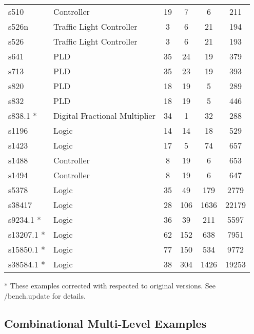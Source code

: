 {\begin{pespace}
\begin{center}
\begin{tabular}{|l|l|c|c|c|c|}
s510    & Controller                & 19     & 7      & 6     &   211 \\
s526n   & Traffic Light Controller  & 3      & 6      & 21    &   194 \\
s526    & Traffic Light Controller  & 3      & 6      & 21    &   193 \\
s641    & PLD                       & 35     & 24     & 19    &   379 \\
s713    & PLD                       & 35     & 23     & 19    &   393 \\
s820    & PLD                       & 18     & 19     & 5     &   289 \\
s832    & PLD                       & 18     & 19     & 5     &   446 \\
s838.1 *& Digital Fractional Multiplier & 34 & 1      & 32    &   288 \\
s1196   & Logic                     & 14     & 14     & 18    &   529 \\
s1423   & Logic                     & 17     & 5      & 74    &   657 \\
s1488   & Controller                & 8      & 19     & 6     &   653 \\
s1494   & Controller                & 8      & 19     & 6     &   647 \\
s5378   & Logic                     & 35     & 49     & 179   &  2779 \\
s38417  & Logic                     & 28     & 106    & 1636  & 22179 \\
s9234.1 *& Logic                    & 36     & 39     & 211   &  5597 \\
s13207.1 *& Logic                   & 62     & 152    & 638   &  7951 \\
s15850.1 *& Logic                   & 77     & 150    & 534   &  9772 \\
s38584.1 *& Logic                   & 38     & 304    & 1426  & 19253 \\
\hline
\end{tabular}
\end{center}
\small{ 
* These examples corrected with respected to original versions.
See /bench.update for details.
}


\newpage

\subsection{Combinational Multi-Level Examples}

\vspace*{.5in}


\end{pespace}}
